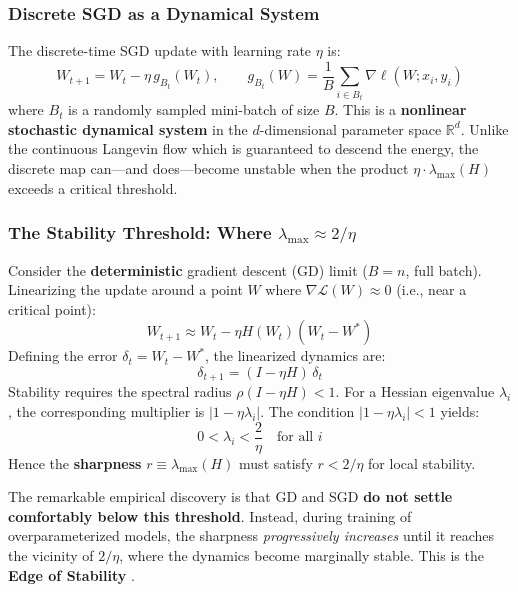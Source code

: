 \documentclass[
  journal=largetwo,
  simfonts=false,
  year=2025,
  volume=37,
]{cup-journal}
\begin{document}
\subsubsection{Discrete SGD as a Dynamical System}

The discrete-time SGD update with learning rate $\eta$ is:
\begin{equation}\label{eq:sgd_discrete_eos}
    W_{t+1} = W_t - \eta \, g_{B_t}(W_t), \qquad g_{B_t}(W) = \frac{1}{B}\sum_{i \in B_t} \nabla \ell(W; x_i, y_i)
\end{equation}
where $B_t$ is a randomly sampled mini-batch of size $B$. This is a \textbf{nonlinear stochastic dynamical system} in the $d$-dimensional parameter space $\mathbb{R}^d$. Unlike the continuous Langevin flow which is guaranteed to descend the energy, the discrete map can---and does---become unstable when the product $\eta \cdot \lambda_{\max}(H)$ exceeds a critical threshold.

\subsubsection{The Stability Threshold: Where \texorpdfstring{$\lambda_{\max} \approx 2/\eta$}{lambda max approx 2 over eta}}

Consider the \textbf{deterministic} gradient descent (GD) limit ($B = n$, full batch). Linearizing the update around a point $W$ where $\nabla \mathcal{L}(W) \approx 0$ (i.e., near a critical point):
\begin{equation}
    W_{t+1} \approx W_t - \eta H(W_t)(W_t - W^*)
\end{equation}
Defining the error $\delta_t = W_t - W^*$, the linearized dynamics are:
\begin{equation}
    \delta_{t+1} = (I - \eta H)\,\delta_t
\end{equation}
Stability requires the spectral radius $\rho(I - \eta H) < 1$. For a Hessian eigenvalue $\lambda_i$, the corresponding multiplier is $|1 - \eta \lambda_i|$. The condition $|1 - \eta \lambda_i| < 1$ yields:
\begin{equation}\label{eq:eos_condition}
    0 < \lambda_i < \frac{2}{\eta} \quad \text{for all } i
\end{equation}
Hence the \textbf{sharpness} $r \equiv \lambda_{\max}(H)$ must satisfy $r < 2/\eta$ for local stability.

The remarkable empirical discovery is that GD and SGD \textbf{do not settle comfortably below this threshold}. Instead, during training of overparameterized models, the sharpness \textit{progressively increases} until it reaches the vicinity of $2/\eta$, where the dynamics become marginally stable. This is the \textbf{Edge of Stability} \cite{cohen2021gradient}.
\end{document}
